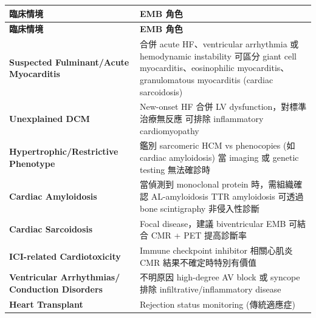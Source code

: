 \documentclass[12pt,a4paper]{article}
\begin{document}
\begin{longtable}{p{4cm}p{10cm}}
\toprule
\textbf{臨床情境} & \textbf{EMB 角色} \\
\midrule
\endfirsthead

\toprule
\textbf{臨床情境} & \textbf{EMB 角色} \\
\midrule
\endhead

\bottomrule
\endfoot

\textbf{Suspected Fulminant/Acute Myocarditis} &
合併 acute HF、ventricular arrhythmia 或 hemodynamic instability\newline
可區分 giant cell myocarditis、eosinophilic myocarditis、granulomatous myocarditis (cardiac sarcoidosis) \\
\midrule

\textbf{Unexplained DCM} &
New-onset HF 合併 LV dysfunction，對標準治療無反應\newline
可排除 inflammatory cardiomyopathy \\
\midrule

\textbf{Hypertrophic/Restrictive Phenotype} &
鑑別 sarcomeric HCM vs phenocopies (如 cardiac amyloidosis)\newline
當 imaging 或 genetic testing 無法確診時 \\
\midrule

\textbf{Cardiac Amyloidosis} &
當偵測到 monoclonal protein 時，需組織確認 AL-amyloidosis\newline
TTR amyloidosis 可透過 bone scintigraphy 非侵入性診斷 \\
\midrule

\textbf{Cardiac Sarcoidosis} &
Focal disease，建議 biventricular EMB\newline
可結合 CMR + PET 提高診斷率 \\
\midrule

\textbf{ICI-related Cardiotoxicity} &
Immune checkpoint inhibitor 相關心肌炎\newline
CMR 結果不確定時特別有價值 \\
\midrule

\textbf{Ventricular Arrhythmias/} \newline \textbf{Conduction Disorders} &
不明原因 high-degree AV block 或 syncope\newline
排除 infiltrative/inflammatory disease \\
\midrule

\textbf{Heart Transplant} &
Rejection status monitoring (傳統適應症) \\
\bottomrule
\end{longtable}
\end{document}
